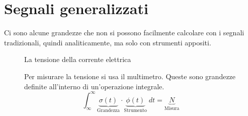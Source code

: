 \documentclass[a4paper]{article}
\begin{document}
\section{Segnali generalizzati}
Ci sono alcune grandezze che non si possono facilmente calcolare con i segnali
tradizionali, quindi analiticamente, ma solo con strumenti appositi.
\begin{figure}[H]
  \begin{example}
    La tensione della corrente elettrica
    \begin{figure}[H]
      \centering
    \end{figure}
    Per misurare la tensione si usa il multimetro. Queste sono grandezze
    definite all'interno di un'operazione integrale.
    \[
      \int_\infty^\infty \underbrace{\sigma(t)}_{\text{Grandezza}} \cdot
      \underbrace{\phi(t)}_{\text{Strumento}} \; dt = \underbrace{N}_{\text{Misura}}
    \] 
  \end{example}
\end{figure}
\end{document}
